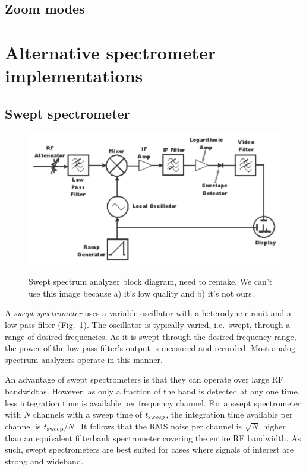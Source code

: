 \documentclass{ws-rv961x669}
\begin{document}
\subsection{Zoom modes}

\section{Alternative spectrometer implementations}

\subsection{Swept spectrometer}\label{swept-spectrometer}

\begin{figure}
 \centering
 \includegraphics[width=\textwidth]{./figures/temp_spec_an_diagram}
 \label{fig:swept-an}
 \caption{Swept spectrum analyzer block diagram, need to remake. We can't use this image because a) it's low quality and b) it's not ours. \label{fig:swept}}
\end{figure}

A \emph{swept spectrometer} uses a variable oscillator with a heterodyne
circuit and a low pass filter (Fig.~\ref{fig:swept}). The oscillator is typically varied, i.e.~swept, through a range of desired frequencies. As it is swept through the desired frequency range, the power of the low pass filter's output is measured and recorded. Most analog spectrum analyzers operate in this manner.

An advantage of swept spectrometers is that they can operate over large RF bandwidths. However, as only a fraction of the band is detected at any one time, less integration time is available per frequency channel. For a swept spectrometer with $N$ channels with a sweep time of $t_{\rm{sweep}}$, the integration time available per channel is $t_{\rm{sweep}}/N$. It follows that  the RMS noise per channel is $\sqrt{N}$ higher than an equivalent filterbank spectrometer covering the entire RF bandwidth. As such, swept spectrometers are best suited for cases where signals of interest are strong and wideband. 
\end{document}

